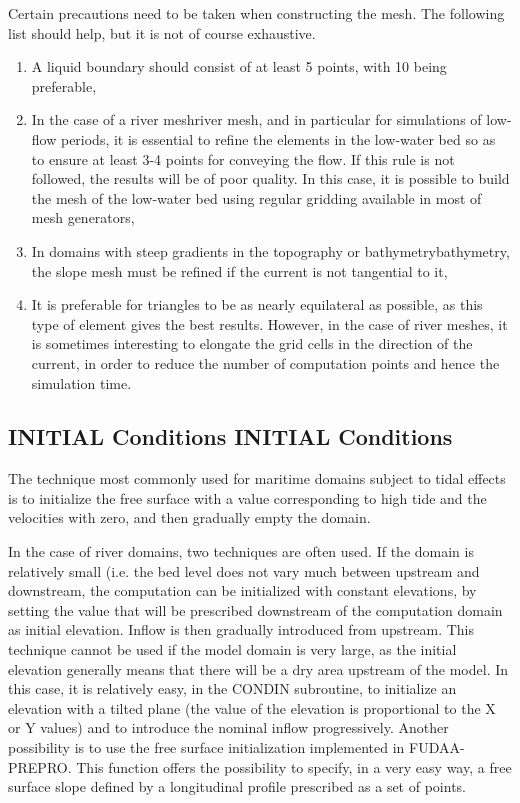 \documentclass{article} %
\begin{document}
 Certain precautions need to be taken when constructing the mesh. The following list should help, but it is not of course exhaustive.

\begin{enumerate}
\item  A liquid boundary should consist of at least 5 points, with 10 being preferable,

\item  In the case of a river meshriver mesh, and in particular for simulations of low-flow periods, it is essential to refine the elements in the low-water bed so as to ensure at least 3-4 points for conveying the flow. If this rule is not followed, the results will be of poor quality. In this case, it is possible to build the mesh of the low-water bed using regular gridding available in most of mesh generators,

\item  In domains with steep gradients in the topography or bathymetrybathymetry, the slope mesh must be refined if the current is not tangential to it,

\item  It is preferable for triangles to be as nearly equilateral as possible, as this type of element gives the best results. However, in the case of river meshes, it is sometimes interesting to elongate the grid cells in the direction of the current, in order to reduce the number of computation points and hence the simulation time.
\end{enumerate}


\subsection{ INITIAL Conditions INITIAL Conditions}

 The technique most commonly used for maritime domains subject to tidal effects is to initialize the free surface with a value corresponding to high tide and the velocities with zero, and then gradually empty the domain.

 In the case of river domains, two techniques are often used. If the domain is relatively small (i.e. the bed level does not vary much between upstream and downstream, the computation can be initialized with constant elevations, by setting the value that will be prescribed downstream of the computation domain as initial elevation. Inflow is then gradually introduced from upstream. This technique cannot be used if the model domain is very large, as the initial elevation generally means that there will be a dry area upstream of the model.  In this case, it is relatively easy, in the CONDIN subroutine, to initialize an elevation with a tilted plane (the value of the elevation is proportional to the X or Y values) and to introduce the nominal inflow progressively. Another possibility is to use the free surface initialization implemented in FUDAA-PREPRO. This function offers the possibility to specify, in a very easy way, a free surface slope defined by a longitudinal profile prescribed as a set of points.
\end{document}
